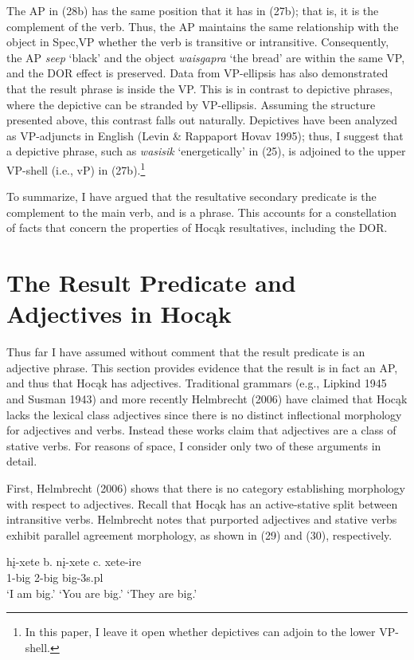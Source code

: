 \documentclass[output=paper]{LSP/langsci}
\begin{document}
The AP in (28b) has the same position that it has in (27b); that is, it is the complement of the verb. Thus, the AP maintains the same relationship with the object in Spec,VP whether the verb is transitive or intransitive. Consequently, the AP \textit{seep} `black' and the object \textit{waisgapra} `the bread' are within the same VP, and the DOR effect is preserved. Data from VP-ellipsis has also demonstrated that the result phrase is inside the VP. This is in contrast to depictive phrases, where the depictive can be stranded by VP-ellipsis. Assuming the structure presented above, this contrast falls out naturally. Depictives have been analyzed as VP-adjuncts in English (Levin \& Rappaport Hovav 1995); thus, I suggest that a depictive phrase, such as \textit{wasisik} `energetically' in (25), is adjoined to the upper VP-shell (i.e., vP) in (27b).\footnote{In this paper, I leave it open whether depictives can adjoin to the lower VP-shell.}

To summarize, I have argued that the resultative secondary predicate is the complement to the main verb, and is a phrase. This accounts for a constellation of facts that concern the properties of Hoc\k{a}k resultatives, including the DOR.

\section{The Result Predicate and Adjectives in Hoc\k{a}k} 

Thus far I have assumed without comment that the result predicate is an adjective phrase. This section provides evidence that the result is in fact an AP, and thus that Hoc\k{a}k has adjectives. Traditional grammars (e.g., Lipkind 1945 and Susman 1943) and more recently Helmbrecht (2006) have claimed that Hoc\k{a}k lacks the lexical class adjectives since there is no distinct inflectional morphology for adjectives and verbs. Instead these works claim that adjectives are a class of stative verbs. For reasons of space, I consider only two of these arguments in detail.

First, Helmbrecht (2006) shows that there is no category establishing morphology with respect to adjectives. Recall that Hoc\k{a}k has an active-stative split between intransitive verbs. Helmbrecht notes that purported adjectives and stative verbs exhibit parallel agreement morphology, as shown in (29) and (30), respectively.

\begin{exe}
\ex
\begin{xlist}
\ex \gll
h\k{i}-xete \hspace{36pt} b. {}  n\k{i}-xete \hspace{48pt} c. {} xete-ire\\
1-big {} {} {} 2-big {} {}  {} big-{\textsc 3s.pl}\\
\glt `I am big.' \hspace{1.2cm} `You are big.' \hspace{1.1cm} `They are big.'

\end{xlist}
\end{exe}
\end{document}
